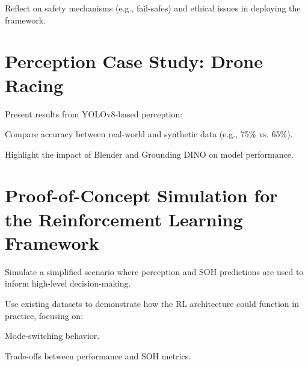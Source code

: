 Reflect on safety mechanisms (e.g., fail-safes) and ethical issues in deploying the framework.


\section{Perception Case Study: Drone Racing}

Present results from YOLOv8-based perception:

Compare accuracy between real-world and synthetic data (e.g., 75\% vs. 65\%).

Highlight the impact of Blender and Grounding DINO on model performance.

\section{Proof-of-Concept Simulation for the Reinforcement Learning Framework}

Simulate a simplified scenario where perception and SOH predictions are used to inform high-level decision-making.

Use existing datasets to demonstrate how the \gls{RL} architecture could function in practice, focusing on:

Mode-switching behavior.

Trade-offs between performance and \gls{SOH} metrics.

\endinput
